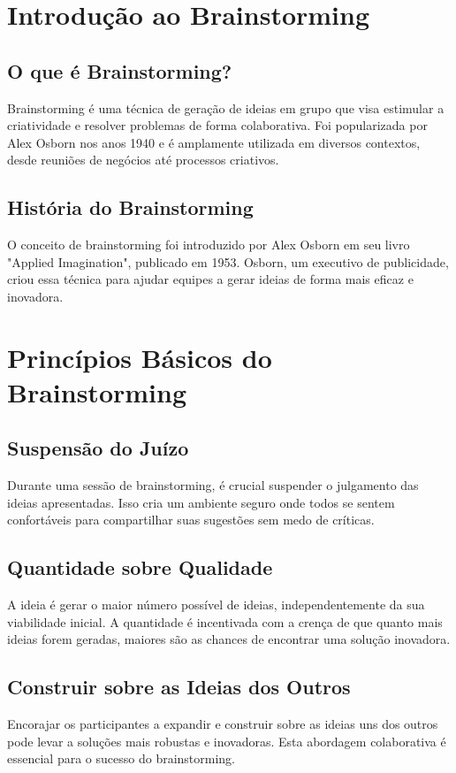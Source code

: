 \documentclass{ufersa}
\begin{document}
\maketitle

\section{Introdução ao Brainstorming}
\subsection{O que é Brainstorming?}
Brainstorming é uma técnica de geração de ideias em grupo que visa estimular a criatividade e resolver problemas de forma colaborativa. Foi popularizada por Alex Osborn nos anos 1940 e é amplamente utilizada em diversos contextos, desde reuniões de negócios até processos criativos.

\subsection{História do Brainstorming}
O conceito de brainstorming foi introduzido por Alex Osborn em seu livro "Applied Imagination", publicado em 1953. Osborn, um executivo de publicidade, criou essa técnica para ajudar equipes a gerar ideias de forma mais eficaz e inovadora.

\section{Princípios Básicos do Brainstorming}
\subsection{Suspensão do Juízo}
Durante uma sessão de brainstorming, é crucial suspender o julgamento das ideias apresentadas. Isso cria um ambiente seguro onde todos se sentem confortáveis para compartilhar suas sugestões sem medo de críticas.

\subsection{Quantidade sobre Qualidade}
A ideia é gerar o maior número possível de ideias, independentemente da sua viabilidade inicial. A quantidade é incentivada com a crença de que quanto mais ideias forem geradas, maiores são as chances de encontrar uma solução inovadora.

\subsection{Construir sobre as Ideias dos Outros}
Encorajar os participantes a expandir e construir sobre as ideias uns dos outros pode levar a soluções mais robustas e inovadoras. Esta abordagem colaborativa é essencial para o sucesso do brainstorming.
\end{document}

